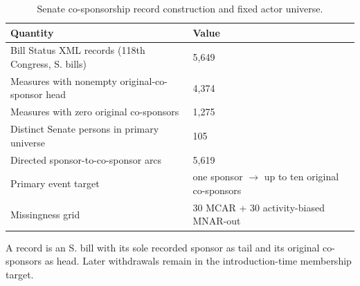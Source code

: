 \begin{table}[tbp]
\centering
\small
\caption{Senate co-sponsorship record construction and fixed actor universe.}
\label{tab:senate-data}
\begin{tabular}{p{}p{}}
\toprule
Quantity & Value \\
\midrule
Bill Status XML records (118th Congress, S. bills) & 5,649 \\
Measures with nonempty original-co-sponsor head & 4,374 \\
Measures with zero original co-sponsors & 1,275 \\
Distinct Senate persons in primary universe & 105 \\
Directed sponsor-to-co-sponsor arcs & 5,619 \\
Primary event target & one sponsor $\to$ up to ten original co-sponsors \\
Missingness grid & 30 MCAR + 30 activity-biased MNAR-out \\
\bottomrule
\end{tabular}
\par\vspace{2pt}\footnotesize A record is an S. bill with its sole recorded sponsor as tail and its original co-sponsors as head. Later withdrawals remain in the introduction-time membership target.
\end{table}
